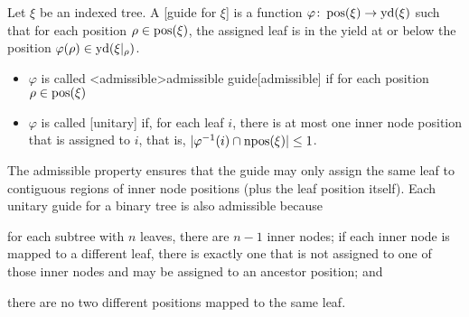 \documentclass[../../document.tex]{subfiles}
\begin{document}
    \begin{definition}[Guide]\label{def:guide}
        Let \(\xi\) be an indexed tree.
        A [guide for \(\xi\)] is a function \(\varphi\colon \operatorname{pos}(\xi) \to \operatorname{yd}(\xi)\) such that for each position \(\rho \in \operatorname{pos}(\xi)\), the assigned leaf is in the yield at or below the position \(\varphi(\rho) \in \operatorname{yd}(\xi|_\rho)\).
        \begin{itemize}
            \item \(\varphi\) is called <admissible>{admissible guide}[admissible] if for each position \(\rho \in \operatorname{pos}(\xi)\)
            \item \(\varphi\) is called [unitary] if, for each leaf \(i\), there is at most one inner node position that is assigned to \(i\), that is, \(|\varphi^{-1}(i) \cap \operatorname{npos}(\xi)| \leq 1\).
        \end{itemize}
    \end{definition}

    The admissible property ensures that the guide may only assign the same leaf to contiguous regions of inner node positions (plus the leaf position itself).
    Each unitary guide for a binary tree is also admissible because
    \begin{inparaenum}
        \item for each subtree with \(n\) leaves, there are \(n-1\) inner nodes; if each inner node is mapped to a different leaf, there is exactly one that is not assigned to one of those inner nodes and may be assigned to an ancestor position; and
        \item there are no two different positions mapped to the same leaf.
    \end{inparaenum}
\end{document}

